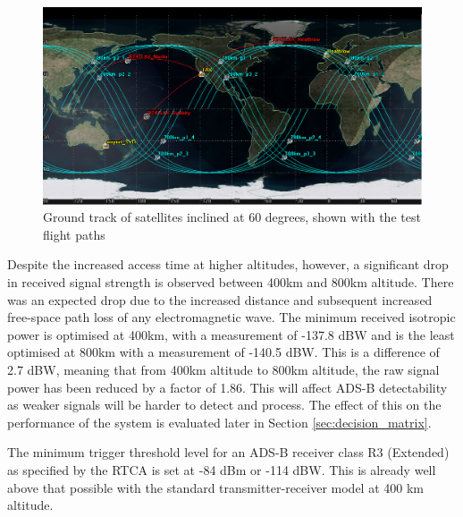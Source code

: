 \begin{figure}[htbp]
	\centering
	\includegraphics[scale = 0.6]{Pictures/12sat_60deg_flightPaths.png}
	
	\caption{Ground track of satellites inclined at 60 degrees, shown with the test flight paths}
	\label{fig:12sat_60deg_flightPaths}
\end{figure} 

Despite the increased access time at higher altitudes, however, a significant drop in received signal strength is observed between 400km and 800km altitude. There was an expected drop due to the increased distance and subsequent increased free-space path loss of any electromagnetic wave.  The minimum received isotropic power is optimised at 400km, with a measurement of -137.8 dBW and is the least optimised at 800km with a measurement of -140.5 dBW. This is a difference of 2.7 dBW, meaning that from 400km altitude to 800km altitude, the raw signal power has been reduced by a factor of 1.86. This will affect ADS-B detectability as weaker signals will be harder to detect and process. The effect of this on the performance of the system is evaluated later in Section \ref{sec:decision_matrix}.

The minimum trigger threshold level for an ADS-B receiver class R3 (Extended) as specified by the RTCA is set at -84 dBm \cite{RTCA_MODE_S} or -114 dBW. This is already well above that possible with the standard transmitter-receiver model at 400 km altitude. 


  
 